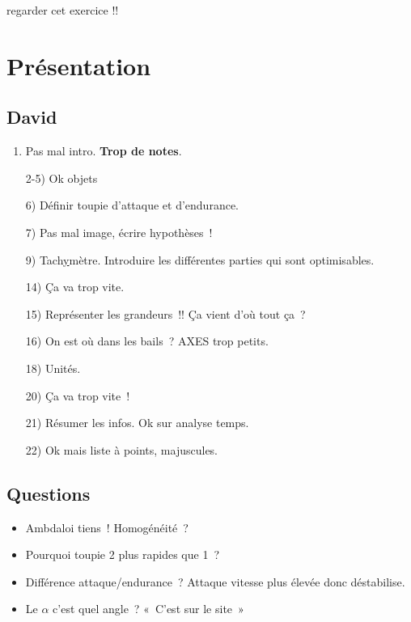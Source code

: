 \documentclass[a4paper, 11pt, final, garamond]{book}
\begin{document}
\begin{center}
  \large regarder cet exercice !!
\end{center}

\section{Présentation}

\subsection{David}
\begin{enumerate}
  \item Pas mal intro. \textbf{Trop de notes}.
  \item[2-5)] Ok objets
  \item[6)] Définir toupie d'attaque et d'endurance.
  \item [7)] Pas mal image, écrire hypothèses~!
  \item [9)] Tach\ul{y}mètre. Introduire les différentes parties qui sont
    optimisables.
  \item [14)] Ça va trop vite.
  \item [15)] Représenter les grandeurs~!! Ça vient d'où tout ça~?
  \item [16)] On est où dans les bails~? AXES trop petits.
  \item [18)] Unités.
  \item [20)] Ça va trop vite~!
  \item [21)] Résumer les infos. Ok sur analyse temps.
  \item [22)] Ok mais liste à points, majuscules.
\end{enumerate}

\subsection{Questions}
\begin{itemize}
  \item Ambdaloi tiens~! Homogénéité~?
  \item Pourquoi toupie 2 plus rapides que 1~?
  \item Différence attaque/endurance~? Attaque vitesse plus élevée donc
    déstabilise.
  \item Le $\alpha$ c'est quel angle~? «~C'est sur le site~»
\end{itemize}
\end{document}
